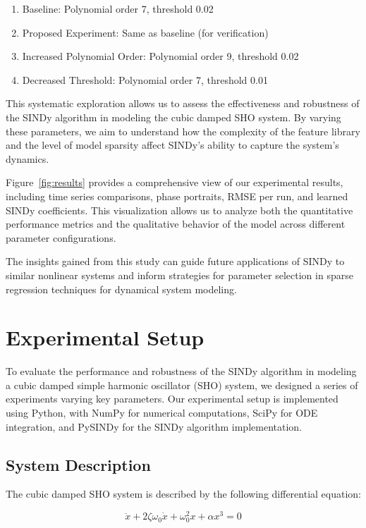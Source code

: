 \documentclass{article} %
\begin{document}
\begin{enumerate}
    \item Baseline: Polynomial order 7, threshold 0.02
    \item Proposed Experiment: Same as baseline (for verification)
    \item Increased Polynomial Order: Polynomial order 9, threshold 0.02
    \item Decreased Threshold: Polynomial order 7, threshold 0.01
\end{enumerate}

This systematic exploration allows us to assess the effectiveness and robustness of the SINDy algorithm in modeling the cubic damped SHO system. By varying these parameters, we aim to understand how the complexity of the feature library and the level of model sparsity affect SINDy's ability to capture the system's dynamics.

Figure~\ref{fig:results} provides a comprehensive view of our experimental results, including time series comparisons, phase portraits, RMSE per run, and learned SINDy coefficients. This visualization allows us to analyze both the quantitative performance metrics and the qualitative behavior of the model across different parameter configurations.

The insights gained from this study can guide future applications of SINDy to similar nonlinear systems and inform strategies for parameter selection in sparse regression techniques for dynamical system modeling.

\section{Experimental Setup}
\label{sec:experimental}

To evaluate the performance and robustness of the SINDy algorithm in modeling a cubic damped simple harmonic oscillator (SHO) system, we designed a series of experiments varying key parameters. Our experimental setup is implemented using Python, with NumPy for numerical computations, SciPy for ODE integration, and PySINDy for the SINDy algorithm implementation.

\subsection{System Description}
The cubic damped SHO system is described by the following differential equation:

\begin{equation}
    \ddot{x} + 2\zeta\omega_0\dot{x} + \omega_0^2x + \alpha x^3 = 0
\end{equation}
\end{document}
